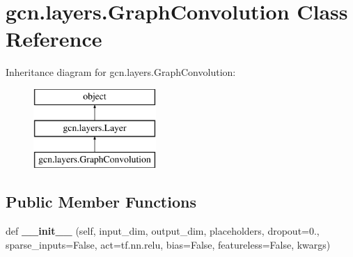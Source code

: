 \hypertarget{classgcn_1_1layers_1_1GraphConvolution}{}\section{gcn.\+layers.\+Graph\+Convolution Class Reference}
\label{classgcn_1_1layers_1_1GraphConvolution}
Inheritance diagram for gcn.\+layers.\+Graph\+Convolution\+:\begin{figure}[H]
\begin{center}
\leavevmode
\includegraphics[height=3.000000cm]{classgcn_1_1layers_1_1GraphConvolution}
\end{center}
\end{figure}
\subsection*{Public Member Functions}
\begin{DoxyCompactItemize}
\item 
\mbox{\label{classgcn_1_1layers_1_1GraphConvolution_a13e245ef2054d11c9bc909ed51a18957}} 
def {\bfseries \+\_\+\+\_\+init\+\_\+\+\_\+} (self, input\+\_\+dim, output\+\_\+dim, placeholders, dropout=0., sparse\+\_\+inputs=False, act=tf.\+nn.\+relu, bias=False, featureless=False, kwargs)
\end{DoxyCompactItemize}

